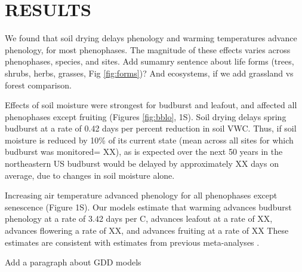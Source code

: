 \documentclass{article}
\begin{document}
\section* {RESULTS}

We found that soil drying delays phenology and warming temperatures advance phenology, for most phenophases. The magnitude of these effects varies across phenophases, species, and sites. Add sumamry sentence about life forms (trees, shrubs, herbs, grasses, Fig \ref{fig:forms})? And ecosystems, if we add grassland vs forest comparison.
\par Effects of soil moisture were strongest for budburst and leafout, and affected all phenophases except fruiting (Figures \ref{fig:bblo}, 1S). Soil drying delays spring budburst at a rate of 0.42 days per percent reduction in soil VWC. Thus, if soil moisture is reduced by 10\% of its current state (mean across all sites for which budburst was monitored= XX), as is expected over the next 50 years in the northeastern US \citep{berg2017} budburst would be delayed by approximately XX days on average, due to changes in soil moisture alone.

\par  Increasing air temperature advanced phenology for all phenophases except senescence (Figure 1S). Our models estimate that warming advances budburst phenology at a rate of 3.42 days per \degree C, advances leafout at a rate of XX, advances flowering a rate of XX, and advances fruiting at a rate of XX These estimates are consistent with estimates from previous meta-analyses \citep{wolkovich2012}. 

\par  Add a paragraph about GDD models


\end{document}
